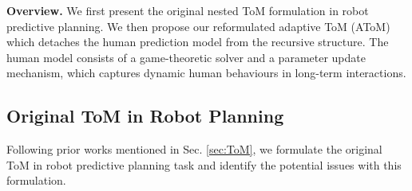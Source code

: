 
\textbf{Overview.} 
We first present the original nested ToM formulation in robot predictive planning. We then propose our reformulated adaptive ToM (AToM) which detaches the human prediction model from the recursive structure. The human model consists of a game-theoretic solver and a parameter update mechanism, which captures dynamic human behaviours in long-term interactions.

\subsection{Original ToM in Robot Planning}
Following prior works mentioned in Sec. \ref{sec:ToM}, we formulate the original ToM in robot predictive planning task and identify the potential issues with this formulation.


